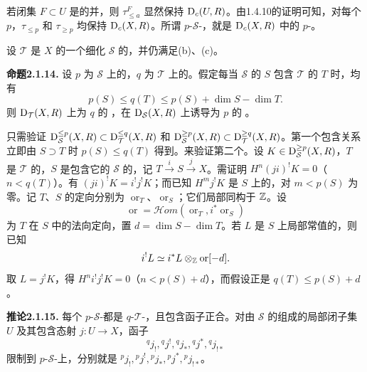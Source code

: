 若闭集 $F\subset U$ 是的并，则 $\tau^F_{\leq a}$ 显然保持 $\mathrm{D}_c(U,R)$。由1.4.10的证明可知，对每个 $p$，$\tau_{\leq p}$ 和 $\tau_{\geq p}$ 均保持 $\mathrm{D}_c(X,R)$。所谓 $p$-$\mathcal S$-，就是
$\mathrm{D}_c(X,R)$ 中的 $p$-。

设 $\mathcal T$ 是 $X$ 的一个细化 $\mathcal S$ 的，并仍满足(b)、(c)。

\par\medskip\noindent\textbf{命题2.1.14.} 设 $p$ 为 $\mathcal S$ 上的，$q$ 为 $\mathcal T$ 上的。假定每当 $\mathcal S$ 的 $S$ 包含 $\mathcal T$ 的 $T$ 时，均有
\[
 p(S)\leq q(T)\leq p(S)+\dim S-\dim T.
\]
则 $\mathrm{D}_{\mathcal T}(X,R)$ 上为 $q$ 的 ，在 $\mathrm{D}_{\mathcal S}(X,R)$ 上诱导为 $p$ 的 。

只需验证 $\mathrm{D}_{\mathcal S}^{\leq p}(X,R)\subset\mathrm{D}_{\mathcal T}^{\leq q}(X,R)$ 和 $\mathrm{D}_{\mathcal S}^{\geq p}(X,R)\subset\mathrm{D}_{\mathcal T}^{\geq q}(X,R)$。第一个包含关系立即由 $S\supset T$ 时 $p(S)\leq q(T)$ 得到。来验证第二个。设 $K\in\mathrm{D}_{\mathcal S}^{\geq p}(X,R)$，$T$ 是 $\mathcal T$ 的，$S$ 是包含它的 $\mathcal S$ 的，记 $T\xrightarrow{i}S\xrightarrow{j}X$。需证明 $H^n(ji)^!K=0$（$n<q(T)$）。有 $(ji)^!K=i^!j^!K$；而已知 $H^mj^!K$ 是 $S$ 上的，对 $m<p(S)$ 为零。记 $T$、$S$ 的定向分别为 $\operatorname{or}_T$、$\operatorname{or}_S$；它们局部同构于 $\mathbb Z$。设
\[
 \operatorname{or}=\mathcal Hom(\operatorname{or}_T,i^*\operatorname{or}_S)
\]
为 $T$ 在 $S$ 中的法向定向，置 $d=\dim S-\dim T$。若 $L$ 是 $S$ 上局部常值的，则已知
\[
 i^!L\simeq i^*L\otimes_{\mathbb Z}\operatorname{or}[-d].
\]
取 $L=j^!K$，得 $H^ni^!j^!K=0$（$n<p(S)+d$），而假设正是 $q(T)\leq p(S)+d$。

\par\medskip\noindent\textbf{推论2.1.15.} 每个 $p$-$\mathcal S$-都是 $q$-$\mathcal T$-，且包含函子正合。对由 $\mathcal S$ 的组成的局部闭子集 $U$ 及其包含态射 $j\colon U\to X$，函子
\[
 {}^qj_!,{}^qj^!,{}^qj_*,{}^qj^*,{}^qj_{!*}
\]
限制到 $p$-$\mathcal S$-上，分别就是 ${}^pj_!,{}^pj^!,{}^pj_*,{}^pj^*,{}^pj_{!*}$。

